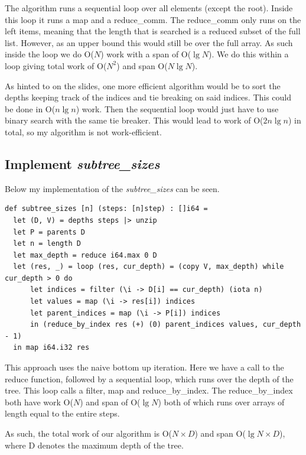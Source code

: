 The algorithm runs a sequential loop over all elements (except the root).
Inside this loop it runs a map and a reduce\_comm. The reduce\_comm only runs
on the left items, meaning that the length that is searched is a reduced subset
of the full list. However, as an upper bound this would still be over the full
array. As such inside the loop we do O($N$) work with a span of O($\lg N$). We
do this within a loop giving total work of O($N^2$) and span O($N \lg N$).

As hinted to on the slides, one more efficient algorithm would be to sort the
depths keeping track of the indices and tie breaking on said indices. This
could be done in O($n \lg n$) work. Then the sequential loop would just have to
use binary search with the same tie breaker. This would lead to work of O($2n
\lg n$) in total, so my algorithm is not work-efficient.

\subsection{Implement \emph{subtree\_sizes}}
Below my implementation of the \emph{subtree\_sizes} can be seen.
\begin{lstlisting}[language={futhark}]
def subtree_sizes [n] (steps: [n]step) : []i64 =
  let (D, V) = depths steps |> unzip 
  let P = parents D
  let n = length D
  let max_depth = reduce i64.max 0 D
  let (res, _) = loop (res, cur_depth) = (copy V, max_depth) while cur_depth > 0 do
      let indices = filter (\i -> D[i] == cur_depth) (iota n)
      let values = map (\i -> res[i]) indices
      let parent_indices = map (\i -> P[i]) indices
      in (reduce_by_index res (+) (0) parent_indices values, cur_depth - 1)
  in map i64.i32 res
\end{lstlisting}

This approach uses the naive bottom up iteration. Here we have a call to the
reduce function, followed by a sequential loop, which runs over the depth of
the tree. This loop calls a filter, map and reduce\_by\_index. The
reduce\_by\_index both have work O($N$) and span of O($\lg N$) both of which
runs over arrays of length equal to the entire steps.

As such, the total work of our algorithm is O($N \times D$) and span O($\lg N
\times D$), where D denotes the maximum depth of the tree.

